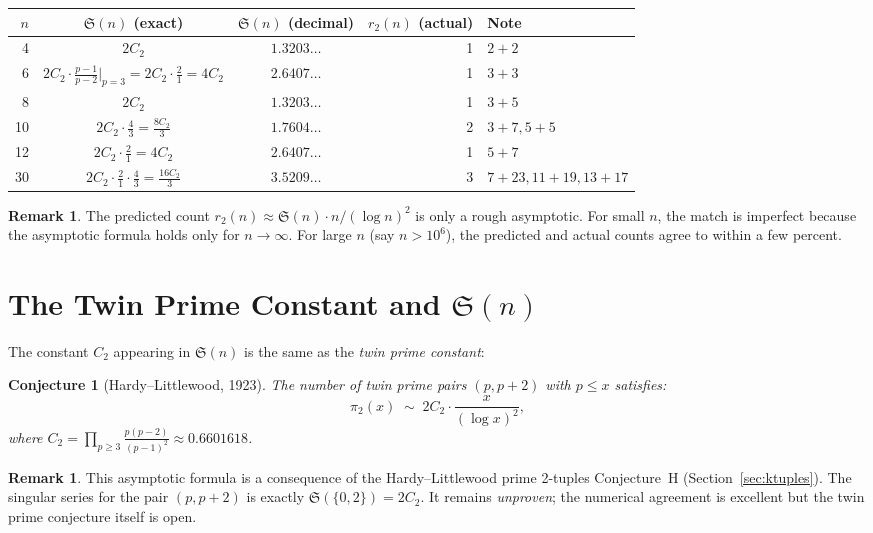 \documentclass[12pt,a4paper]{amsart}
\newtheorem{conjecture}[theorem]{Conjecture}
\theoremstyle{definition}
\newtheorem{remark}[theorem]{Remark}
\begin{document}
\begin{center}
\begin{tabular}{rccrl}
\toprule
$n$ & $\mathfrak{S}(n)$ (exact) & $\mathfrak{S}(n)$ (decimal) & $r_2(n)$ (actual) & Note \\
\midrule
4  & $2C_2$ & $1.3203\ldots$ & 1 & $2+2$ \\
6  & $2 C_2 \cdot \tfrac{p-1}{p-2}\big|_{p=3} = 2C_2\cdot\tfrac{2}{1} = 4C_2$ & $2.6407\ldots$ & 1 & $3+3$ \\
8  & $2C_2$ & $1.3203\ldots$ & 1 & $3+5$ \\
10 & $2 C_2 \cdot \frac{4}{3} = \frac{8C_2}{3}$ & $1.7604\ldots$ & 2 & $3+7, 5+5$ \\
12 & $2 C_2 \cdot \frac{2}{1} = 4C_2$ & $2.6407\ldots$ & 1 & $5+7$ \\
30 & $2 C_2 \cdot \frac{2}{1}\cdot\frac{4}{3} = \frac{16C_2}{3}$ & $3.5209\ldots$ & 3 & $7+23,11+19,13+17$ \\
\bottomrule
\end{tabular}
\end{center}

\begin{remark}
  The predicted count $r_2(n) \approx \mathfrak{S}(n) \cdot n / (\log n)^2$
  is only a rough asymptotic.  For small $n$, the match is imperfect
  because the asymptotic formula holds only for $n \to \infty$.
  For large $n$ (say $n > 10^6$), the predicted and actual counts agree
  to within a few percent.
\end{remark}

\section{The Twin Prime Constant and $\mathfrak{S}(n)$}
\label{sec:twinprime_const}

The constant $C_2$ appearing in $\mathfrak{S}(n)$ is the same as the
\emph{twin prime constant}:

\begin{conjecture}[Hardy--Littlewood, 1923]\label{conj:twin_prime_count}
  The number of twin prime pairs $(p, p+2)$ with $p \leq x$ satisfies:
  \[
    \pi_2(x) \;\sim\; 2 C_2 \cdot \frac{x}{(\log x)^2},
  \]
  where $C_2 = \prod_{p \geq 3} \frac{p(p-2)}{(p-1)^2} \approx 0.6601618$.
\end{conjecture}

\begin{remark}
  This asymptotic formula is a consequence of the Hardy--Littlewood
  prime 2-tuples Conjecture~H (Section~\ref{sec:ktuples}).  The singular
  series for the pair $(p, p+2)$ is exactly $\mathfrak{S}(\{0, 2\}) = 2C_2$.
  It remains \emph{unproven}; the numerical agreement is excellent but the
  twin prime conjecture itself is open.
\end{remark}
\end{document}
